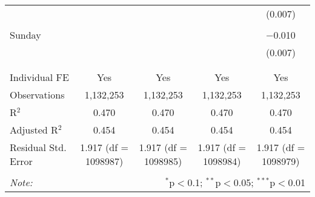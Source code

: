 \documentclass[
]{article}
\begin{document}
\begin{table}[!htbp]
{\begin{tabular}{@{\extracolsep{5pt}}lcccc}
  &  &  &  & (0.007) \\ 
  & & & & \\ 
 Sunday &  &  &  & $-$0.010 \\ 
  &  &  &  & (0.007) \\ 
  & & & & \\ 
\hline \\[-1.8ex] 
Individual FE & Yes & Yes & Yes & Yes \\ 
Observations & 1,132,253 & 1,132,253 & 1,132,253 & 1,132,253 \\ 
R$^{2}$ & 0.470 & 0.470 & 0.470 & 0.470 \\ 
Adjusted R$^{2}$ & 0.454 & 0.454 & 0.454 & 0.454 \\ 
Residual Std. Error & 1.917 (df = 1098987) & 1.917 (df = 1098985) & 1.917 (df = 1098984) & 1.917 (df = 1098979) \\ 
\hline 
\hline \\[-1.8ex] 
\textit{Note:}  & \multicolumn{4}{r}{$^{*}$p$<$0.1; $^{**}$p$<$0.05; $^{***}$p$<$0.01} \\ 
\end{tabular}
} 
\end{table} 
\newpage
\end{document}
